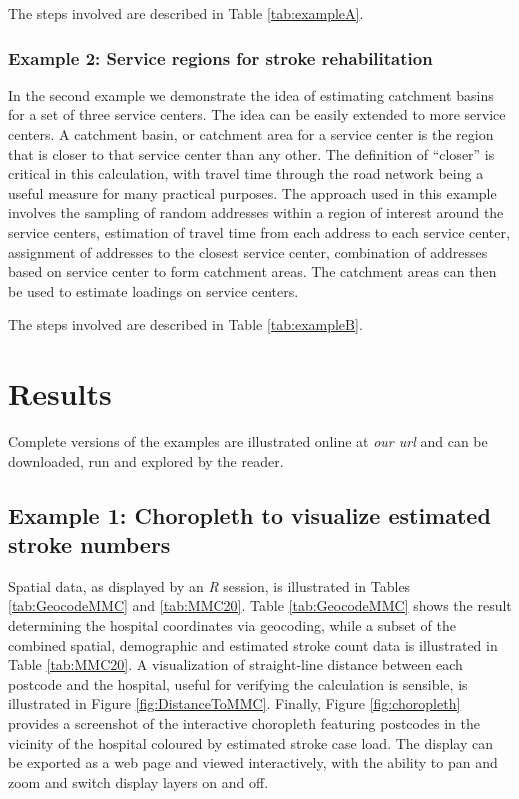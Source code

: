 \documentclass[utf8]{frontiersHLTH}
\begin{document}
The steps involved are described in Table \ref{tab:exampleA}.

\subsubsection{Example 2: Service regions for stroke
rehabilitation}\label{example-2-service-regions-for-stroke-rehabilitation}

In the second example we demonstrate the idea of estimating catchment
basins for a set of three service centers. The idea can be easily
extended to more service centers. A catchment basin, or catchment area
for a service center is the region that is closer to that service center
than any other. The definition of ``closer'' is critical in this
calculation, with travel time through the road network being a useful
measure for many practical purposes. The approach used in this example
involves the sampling of random addresses within a region of interest
around the service centers, estimation of travel time from each address
to each service center, assignment of addresses to the closest service
center, combination of addresses based on service center to form
catchment areas. The catchment areas can then be used to estimate
loadings on service centers.

The steps involved are described in Table \ref{tab:exampleB}.

\section{Results}
Complete versions of the examples are illustrated online at {\em our
  url} and can be downloaded, run and explored by the reader.

\subsection{Example 1: Choropleth to visualize estimated stroke numbers}
Spatial data, as displayed by an {\em R} session, is illustrated in
Tables \ref{tab:GeocodeMMC} and \ref{tab:MMC20}. Table
\ref{tab:GeocodeMMC} shows the result determining the hospital
coordinates via geocoding, while a subset of the combined spatial,
demographic and estimated stroke count data is illustrated in Table
\ref{tab:MMC20}. A visualization of straight-line distance between
each postcode and the hospital, useful for verifying the calculation
is sensible, is illustrated in Figure
\ref{fig:DistanceToMMC}. Finally, Figure \ref{fig:choropleth} provides
a screenshot of the interactive choropleth featuring postcodes in the
vicinity of the hospital coloured by estimated stroke case load. The display
can be exported as a web page and viewed interactively, with the ability to
pan and zoom and switch display layers on and off.
\end{document}
